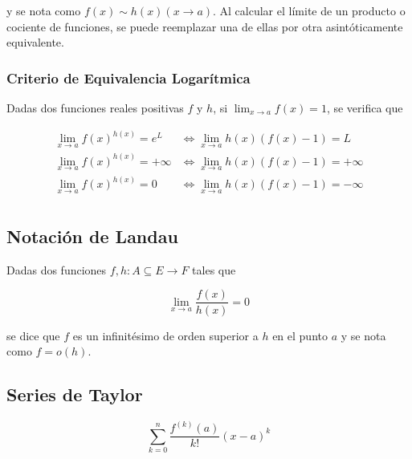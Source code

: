 y se nota como $f(x)\sim h(x)(x\to a)$. Al calcular el límite de un producto o cociente de funciones, se puede reemplazar una de ellas por otra asintóticamente equivalente.

\subsubsection{Criterio de Equivalencia Logarítmica}

Dadas dos funciones reales positivas $f$ y $h$, si $\lim_{x\to a}f(x) = 1$, se verifica que

\begin{equation}
\begin{split}
    \lim_{x\to a}f(x)^{h(x)} = e^L &\Leftrightarrow
    \lim_{x\to a}h(x)(f(x)-1) = L\\
    \lim_{x\to a}f(x)^{h(x)} = +\infty &\Leftrightarrow
    \lim_{x\to a}h(x)(f(x)-1) = +\infty\\
    \lim_{x\to a}f(x)^{h(x)} = 0 &\Leftrightarrow
    \lim_{x\to a}h(x)(f(x)-1) = -\infty\\
\end{split}
\nonumber
\end{equation}

\subsection{Notación de Landau}

Dadas dos funciones $f, h:A\subseteq E \to F$ tales que

\[\lim_{x\to a}\frac{f(x)}{h(x)} = 0\]

se dice que $f$ es un infinitésimo de orden superior a $h$ en el punto $a$ y se nota como $f = o(h)$.

\subsection{Series de Taylor}

\[\sum^n_{k=0}\frac{f^{(k)}(a)}{k!}(x-a)^k\]

